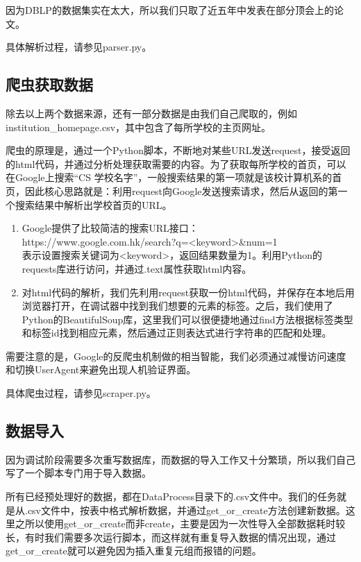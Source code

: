 因为DBLP的数据集实在太大，所以我们只取了近五年中发表在部分顶会上的论文。

具体解析过程，请参见parser.py。

\subsection{爬虫获取数据}

除去以上两个数据来源，还有一部分数据是由我们自己爬取的，例如institution\_homepage.csv，其中包含了每所学校的主页网址。

爬虫的原理是，通过一个Python脚本，不断地对某些URL发送request，接受返回的html代码，并通过分析处理获取需要的内容。为了获取每所学校的首页，可以在Google上搜索“CS 学校名字”，一般搜索结果的第一项就是该校计算机系的首页，因此核心思路就是：利用request向Google发送搜索请求，然后从返回的第一个搜索结果中解析出学校首页的URL。
\begin{enumerate}
\item Google提供了比较简洁的搜索URL接口：\\
https://www.google.com.hk/search?q=<keyword>\&num=1\\
表示设置搜索关键词为<keyword>，返回结果数量为1。利用Python的requests库进行访问，并通过.text属性获取html内容。
\item 对html代码的解析，我们先利用request获取一份html代码，并保存在本地后用浏览器打开，在调试器中找到我们想要的元素的标签。之后，我们使用了Python的BeautifulSoup库，这里我们可以很便捷地通过find方法根据标签类型和标签id找到相应元素，然后通过正则表达式进行字符串的匹配和处理。
\end{enumerate}

需要注意的是，Google的反爬虫机制做的相当智能，我们必须通过减慢访问速度和切换UserAgent来避免出现人机验证界面。

具体爬虫过程，请参见scraper.py。

\subsection{数据导入}

因为调试阶段需要多次重写数据库，而数据的导入工作又十分繁琐，所以我们自己写了一个脚本专门用于导入数据。

所有已经预处理好的数据，都在DataProcess目录下的.csv文件中。我们的任务就是从.csv文件中，按表中格式解析数据，并通过get\_or\_create方法创建新数据。这里之所以使用get\_or\_create而非create，主要是因为一次性导入全部数据耗时较长，有时我们需要多次运行脚本，而这样就有重复导入数据的情况出现，通过get\_or\_create就可以避免因为插入重复元组而报错的问题。

